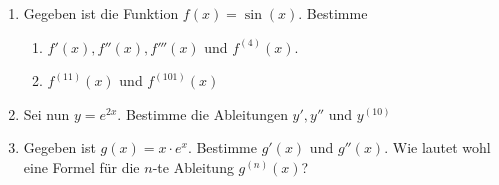 \begin{enumerate}
    \item Gegeben ist die Funktion $f(x) = \sin(x)$. Bestimme
          \begin{enumerate}
              \item $f'(x), f''(x), f'''(x)$ und $f^{(4)}(x)$.
              \item $f^{(11)}(x)$ und $f^{(101)}(x)$
          \end{enumerate}

    \item Sei nun $y=e^{2x}$. Bestimme die Ableitungen $y', y''$ und $y^{(10)}$

    \item Gegeben ist $g(x) = x\cdot e^x$. Bestimme $g'(x)$ und $g''(x)$. Wie lautet wohl eine Formel für die $n$-te Ableitung $g^{(n)}(x)$?
\end{enumerate}
\clearpage
